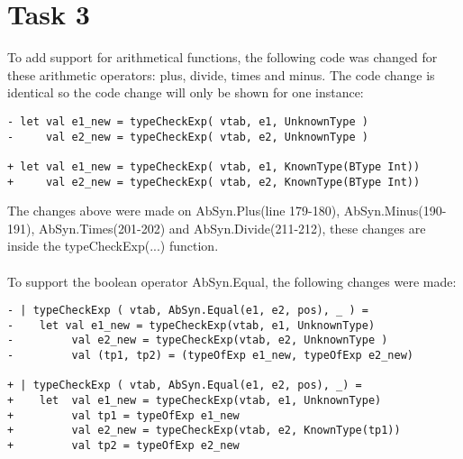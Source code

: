 \section{Task 3}
To add support for arithmetical functions, the following code was changed for these
arithmetic operators: plus, divide, times and minus. The code change is
identical so the code change will only be shown for one instance:
\begin{lstlisting}[style=MLStyle]
- let val e1_new = typeCheckExp( vtab, e1, UnknownType )
-     val e2_new = typeCheckExp( vtab, e2, UnknownType )

+ let val e1_new = typeCheckExp( vtab, e1, KnownType(BType Int))
+     val e2_new = typeCheckExp( vtab, e2, KnownType(BType Int))
\end{lstlisting}

The changes above were made on AbSyn.Plus(line 179-180), AbSyn.Minus(190-191),
AbSyn.Times(201-202) and AbSyn.Divide(211-212), these changes are inside the
typeCheckExp(...) function.\\
\\
To support the boolean operator AbSyn.Equal, the following changes were made:
\begin{lstlisting}[style=MLStyle]
- | typeCheckExp ( vtab, AbSyn.Equal(e1, e2, pos), _ ) =
-    let val e1_new = typeCheckExp(vtab, e1, UnknownType)
-         val e2_new = typeCheckExp(vtab, e2, UnknownType )
-         val (tp1, tp2) = (typeOfExp e1_new, typeOfExp e2_new)

+ | typeCheckExp ( vtab, AbSyn.Equal(e1, e2, pos), _) =
+    let  val e1_new = typeCheckExp(vtab, e1, UnknownType)
+         val tp1 = typeOfExp e1_new
+         val e2_new = typeCheckExp(vtab, e2, KnownType(tp1))
+         val tp2 = typeOfExp e2_new 
\end{lstlisting}

